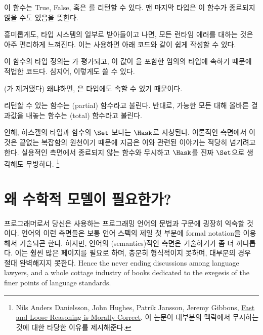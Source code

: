 이 함수는 True, False, 혹은 \code{\_|\_}를 리턴할 수 있다. 맨 마지막 타입은 이 함수가 종료되지 않을 수도 있음을 뜻한다.

흥미롭게도, \trBottom\을 타입 시스템의 일부로 받아들이고 나면, 모든 런타임 에러를 \trBottom{} 대하는 것은 아주 편리하게 느껴진다. 이는  \trExpression\을 사용하면 아래 코드와 같이 쉽게 작성할 수 있다.


이 함수의 타입 정의는 가 \trBottom{} 평가되고, 이 값이 을 포함한 임의의 타입에 속하기 때문에 적법한 코드다. 심지어, 이렇게도 쓸 수 있다.


(가 제거됐다) 왜냐하면, \trBottom 은  타입에도 속할 수 있기 때문이다.

\trBottom\을 리턴할 수 있는 함수는 \trPartial(partial) 함수라고 불린다. 반대로, 가능한 모든  대해 올바른 결과값을 내놓는 함수는 \trTotal(total) 함수라고 불린다.

\trBottom{} 인해, 하스켈의 타입과 함수의 \trCategory\는 $\Set$ 보다는 $\Hask$로 지칭된다.
이론적인 측면에서 이것은 끝없는 복잡함의 원천이기 때문에 지금은 이와 관련된 이야기는 적당히 넘기려고 한다. 실용적인 측면에서 종료되지 않는 함수와 \trBottom\을 무시하고 $\Hask$를 진짜 $\Set$으로 생각해도 무방하다.
\footnote{Nils Anders Danielsson,
John Hughes, Patrik Jansson, Jeremy Gibbons, \href{http://www.cs.ox.ac.uk/jeremy.gibbons/publications/fast+loose.pdf}{
Fast and Loose Reasoning is Morally Correct}. 이 논문이 대부분의 맥락에서 \trBottom\을 무시하는 것에 대한 타당한 이유를 제시해준다.}

\section{왜 수학적 모델이 필요한가?}

프로그래머로서 당신은 사용하는 프로그래밍 언어의 문법과 구문에 굉장히 익숙할 것이다.
언어의 이런 측면들은 보통 언어 스펙의 제일 첫 부분에 formal notation을 이용해서 기술되곤 한다. %
하지만, 언어의 \trSemantics(semantics)적인 측면은 기술하기가 좀 더 까다롭다. 이는 훨씬 많은 페이지를 필요로 하며, 충분히 형식적이지 못하며, 대부분의 경우 절대 완벽해지지 못한다.
Hence the never ending discussions among language
lawyers, and a whole cottage industry of books dedicated to the exegesis
of the finer points of language standards.

